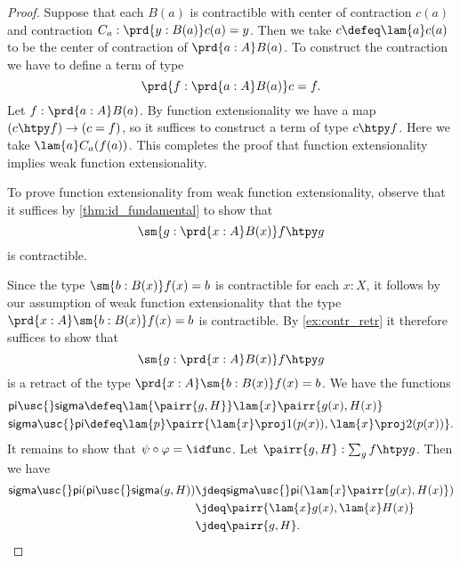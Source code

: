\begin{proof}
Suppose that each $B(a)$ is contractible with center of contraction $c(a)$ and contraction $C_a:\prd{y:B(a)}c(a)=y$. Then we take $c\defeq \lam{a}c(a)$ to be the center of contraction of $\prd{a:A}B(a)$. To construct the contraction we have to define a term of type
\begin{equation*}
\prd{f:\prd{a:A}B(a)}c=f.
\end{equation*}
Let $f:\prd{a:A}B(a)$. By function extensionality we have a map $(c\htpy f)\to (c=f)$, so it suffices to construct a term of type $c\htpy f$. Here we take $\lam{a}C_a(f(a))$. This completes the proof that function extensionality implies weak function extensionality.

To prove function extensionality from weak function extensionality, observe that it suffices by \autoref{thm:id_fundamental} to show that
\begin{equation*}
\sm{g:\prd{x:A}B(x)}f\htpy g
\end{equation*}
is contractible.

Since the type $\sm{b:B(x)}f(x)=b$ is contractible for each $x:X$, it follows by our assumption of weak function extensionality that the type $\prd{x:A}\sm{b:B(x)}f(x)=b$ is contractible. By \autoref{ex:contr_retr} it therefore suffices to show that
\begin{equation*}
\sm{g:\prd{x:A}B(x)}f\htpy g
\end{equation*}
is a retract of the type $\prd{x:A}\sm{b:B(x)}f(x)=b$. We have the functions
\begin{align*}
\mathsf{pi\usc{}sigma} & \defeq \lam{\pairr{g,H}}\lam{x}\pairr{g(x),H(x)} \\
\mathsf{sigma\usc{}pi} & \defeq \lam{p}\pairr{\lam{x}\proj 1(p(x)),\lam{x}\proj 2(p(x))}.
\end{align*}
It remains to show that $\psi\circ\varphi=\idfunc$. Let $\pairr{g,H}:\sum_g f\htpy g$. 
Then we have
\begin{align*}
\mathsf{sigma\usc{}pi}(\mathsf{pi\usc{}sigma}(g,H)) & \jdeq \mathsf{sigma\usc{}pi}(\lam{x}\pairr{g(x),H(x)}) \\
& \jdeq \pairr{\lam{x}g(x),\lam{x}H(x)} \\
& \jdeq \pairr{g,H}.\qedhere
\end{align*}
\end{proof}

\begin{comment}
\begin{rmk}
Since we assumed the $\eta$-rule for $\Sigma$-types, we also have
\begin{align*}
\mathsf{pi\usc{}sigma}(\mathsf{sigma\usc{}pi}(p)) & \jdeq \mathsf{pi\usc{}sigma}(\pairr{\lam{x}\proj 1(p(x)),\lam{x}\proj 2(p(x))}) \\
& \jdeq \lam{x}\pairr{\proj 1(p(x)),\proj 2(p(x))} \\
& \jdeq \lam{x} p(x) \\
& \jdeq p.
\end{align*}
Therefore, the types $\sum_g f\htpy g$ and $\prod_x\sum_b f(x)=b$ are actually \emph{judgmentally isomorphic}. 
\end{rmk}
\end{comment}

